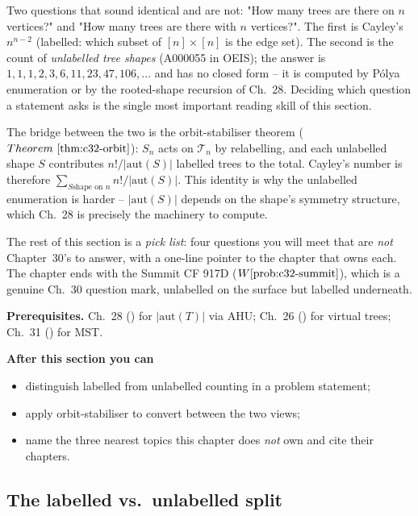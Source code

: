 \begin{topicintro}
Two questions that sound identical and are not: "How many trees are there on
\(n\) vertices?" and "How many trees are there with \(n\) vertices?".  The
first is Cayley's \(n^{n-2}\) (labelled: which subset of \([n]\times[n]\) is
the edge set).  The second is the count of \emph{unlabelled tree shapes}
(A000055 in OEIS); the answer is \(1, 1, 1, 2, 3, 6, 11, 23, 47, 106,\dots\)
and has no closed form -- it is computed by P\'olya enumeration or by the
rooted-shape recursion of Ch.~28.  Deciding which question a statement asks
is the single most important reading skill of this section.

The bridge between the two is the orbit-stabiliser theorem
(\(\thmref{c32-orbit}\)): \(S_n\) acts on \(\mathcal{T}_n\) by relabelling,
and each unlabelled shape \(S\) contributes \(n!/|\mathrm{aut}(S)|\)
labelled trees to the total.  Cayley's number is therefore \(\sum_{S\text{
shape on }n} n!/|\mathrm{aut}(S)|\).  This identity is why the unlabelled
enumeration is harder -- \(|\mathrm{aut}(S)|\) depends on the shape's
symmetry structure, which Ch.~28 is precisely the machinery to compute.

The rest of this section is a \emph{pick list}: four questions you will meet
that are \emph{not} Chapter~30's to answer, with a one-line pointer to the
chapter that owns each.  The chapter ends with the Summit CF 917D
(\(\probref{c32-summit}\)), which is a genuine Ch.~30 question mark,
unlabelled on the surface but labelled underneath.

\textbf{Prerequisites.} Ch.~28 () for \(|\mathrm{aut}(T)|\) via
AHU; Ch.~26 () for virtual trees; Ch.~31 () for MST.

\textbf{After this section you can}
\begin{itemize}[nosep]
  \item distinguish labelled from unlabelled counting in a problem statement; \hfill{}
  \item apply orbit-stabiliser to convert between the two views; \hfill{}
  \item name the three nearest topics this chapter does \emph{not} own and cite their chapters. \hfill{}
\end{itemize}
\end{topicintro}

\subsection{The labelled vs.\ unlabelled split}

